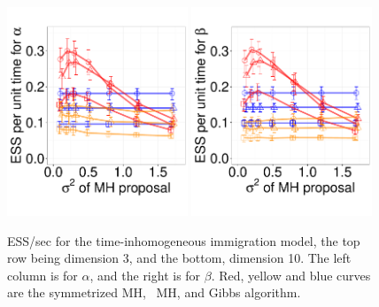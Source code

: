 {\begin{figure}
\begin{minipage}[!hp]{0.8\linewidth}
  \centering
    \includegraphics [width=0.480\textwidth, angle=0]{figures_new_apr12/CQ_alpha_dim10_18apr12.pdf}
    \includegraphics [width=0.480\textwidth, angle=0]{figures_new_apr12/CQ_beta_dim10_18apr12.pdf}
  \end{minipage}
  \begin{minipage}[!hp]{0.19\linewidth}
    \caption{ESS/sec for the time-inhomogeneous immigration model, the top row 
      being dimension 3, and the bottom,
      dimension 10. The left column is for $\alpha$, and the 
    right is for $\beta$. Red, yellow and blue curves are the symmetrized MH,
  \naive\ MH, and Gibbs algorithm.}
     \label{fig:ESS_pc_10}
  \end{minipage}
  \end{figure}

}
